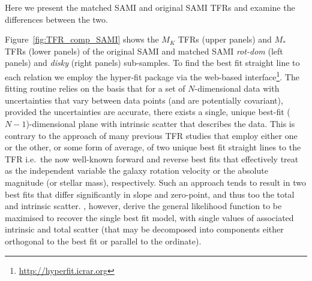 \documentclass[a4paper,fleqn,usenatbib]{mnras}
\begin{document}
{Here we present the matched SAMI and original SAMI TFRs and examine the differences between the two.

Figure~\ref{fig:TFR_comp_SAMI} shows the $M_{K}$ TFRs (upper panels) and $M_{*}$ TFRs (lower panels) of the original SAMI and matched SAMI \textit{rot-dom} (left panels) and \textit{disky} (right panels) sub-samples. To find the best fit straight line to each relation we employ the {\sc hyper-fit} package \citep[][written for the {\sc r} statistical language\footnote{\url{github.com/asgr/hyper.fit}}]{Robotham:2015} via the web-based interface\footnote{\url{http://hyperfit.icrar.org}}. The fitting routine relies on the basis that for a set of $N$-dimensional data with uncertainties that vary between data points (and are potentially covariant), provided the uncertainties are accurate, there exists a single, unique best-fit ($N-1$)-dimensional plane with intrinsic scatter that describes the data. This is contrary to the approach of many previous TFR studies \citep[including][]{Tiley:2016} that employ either one or the other, or some form of average, of two unique best fit straight lines to the TFR i.e.\ the now well-known forward and reverse best fits \citep[e.g.][]{Willick:1994aa} that effectively treat as the independent variable the galaxy rotation velocity or the absolute magnitude (or stellar mass), respectively. Such an approach tends to result in two best fits that differ significantly in slope and zero-point, and thus too the total and intrinsic scatter. \citet{Robotham:2015}, however, derive the general likelihood function to be maximised to recover the single best fit model, with single values of associated intrinsic and total scatter (that may be decomposed into components either orthogonal to the best fit or parallel to the ordinate).  


}
\end{document}
